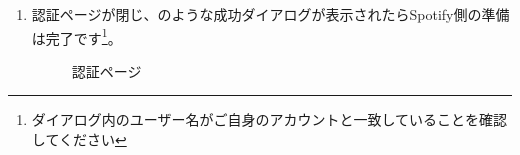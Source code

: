 \begin{enumerate}
            \newpage
            \item 認証ページが閉じ、のような成功ダイアログが表示されたらSpotify側の準備は完了です\footnote{ダイアログ内のユーザー名がご自身のアカウントと一致していることを確認してください}。
                \begin{figure}[htbp]
                    \centering
                    \caption{認証ページ}
                    \label{img:spotify14}
                \end{figure}
        \end{enumerate}

    \newpage

